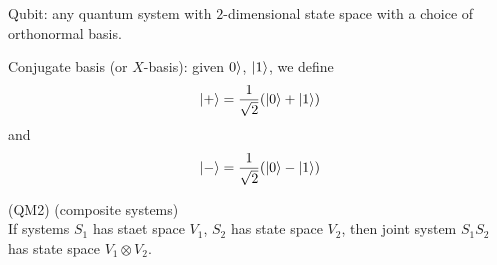 \documentclass[a4paper]{article}
\begin{document}
Qubit: any quantum system with $2$-dimensional state space with a choice of orthonormal basis.

Conjugate basis (or $X$-basis): given $0\rangle$, $|1\rangle$, we define $$|+\rangle = \frac{1}{\sqrt{2}} (|0\rangle+|1\rangle)$$ and $$|-\rangle = \frac{1}{\sqrt{2}}(|0\rangle-|1\rangle)$$

(QM2) (composite systems)\\
If systems $S_1$ has staet space $V_1$, $S_2$ has state space $V_2$, then joint system $S_1S_2$ has state space $V_1 \otimes V_2$.



\iffalse
\begin{equation*}
\begin{aligned}

\end{aligned}
\end{equation*}
\fi
\end{document}

